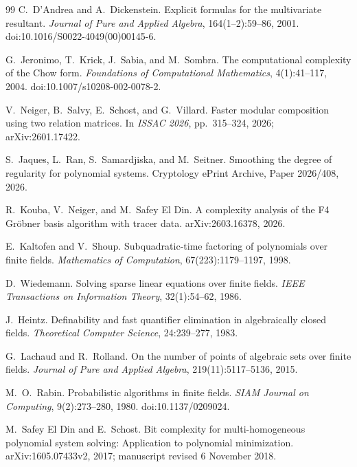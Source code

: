 \documentclass[11pt,a4paper]{article}
\theoremstyle{definition}
\theoremstyle{remark}
\begin{document}
\begin{thebibliography}{99}
C.~D'Andrea and A.~Dickenstein.
\newblock Explicit formulas for the multivariate resultant.
\newblock \emph{Journal of Pure and Applied Algebra}, 164(1--2):59--86, 2001.
\newblock doi:10.1016/S0022-4049(00)00145-6.

G.~Jeronimo, T.~Krick, J.~Sabia, and M.~Sombra.
\newblock The computational complexity of the Chow form.
\newblock \emph{Foundations of Computational Mathematics}, 4(1):41--117, 2004.
\newblock doi:10.1007/s10208-002-0078-2.

V.~Neiger, B.~Salvy, E.~Schost, and G.~Villard.
\newblock Faster modular composition using two relation matrices.
\newblock In \emph{ISSAC 2026}, pp.~315--324, 2026; arXiv:2601.17422.

S.~Jaques, L.~Ran, S.~Samardjiska, and M.~Seitner.
\newblock Smoothing the degree of regularity for polynomial systems.
\newblock Cryptology ePrint Archive, Paper 2026/408, 2026.

R.~Kouba, V.~Neiger, and M.~Safey El Din.
\newblock A complexity analysis of the F4 Gr\"obner basis algorithm with tracer data.
\newblock arXiv:2603.16378, 2026.

E.~Kaltofen and V.~Shoup.
\newblock Subquadratic-time factoring of polynomials over finite fields.
\newblock \emph{Mathematics of Computation}, 67(223):1179--1197, 1998.

D.~Wiedemann.
\newblock Solving sparse linear equations over finite fields.
\newblock \emph{IEEE Transactions on Information Theory}, 32(1):54--62, 1986.

J.~Heintz.
\newblock Definability and fast quantifier elimination in algebraically closed fields.
\newblock \emph{Theoretical Computer Science}, 24:239--277, 1983.

G.~Lachaud and R.~Rolland.
\newblock On the number of points of algebraic sets over finite fields.
\newblock \emph{Journal of Pure and Applied Algebra}, 219(11):5117--5136, 2015.


M.~O.~Rabin.
\newblock Probabilistic algorithms in finite fields.
\newblock \emph{SIAM Journal on Computing}, 9(2):273--280, 1980.
\newblock doi:10.1137/0209024.

M.~Safey El Din and E.~Schost.
\newblock Bit complexity for multi-homogeneous polynomial system solving: Application to polynomial minimization.
\newblock arXiv:1605.07433v2, 2017; manuscript revised 6 November 2018.


\end{thebibliography}
\end{document}
